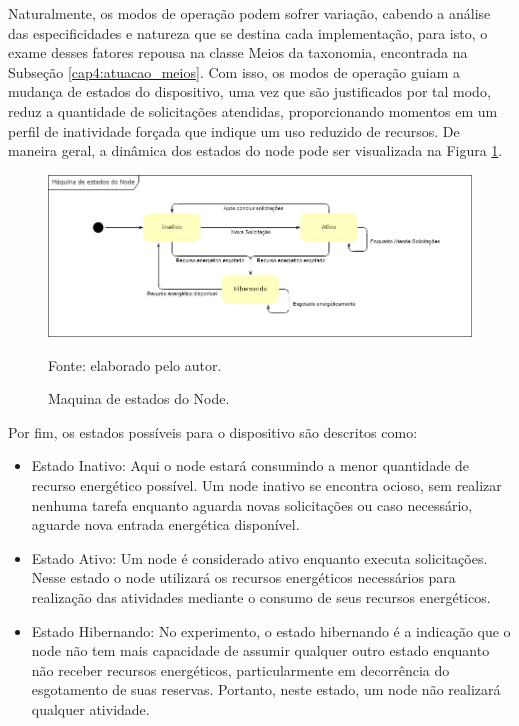 Naturalmente, os modos de operação podem sofrer variação, cabendo a análise das especificidades e natureza que se destina cada implementação, para isto, o exame desses fatores repousa na classe Meios da taxonomia, encontrada na Subseção \ref{cap4:atuacao_meios}. Com isso, os modos de operação guiam a mudança de estados do dispositivo, uma vez que são justificados por tal modo, reduz a quantidade de solicitações atendidas, proporcionando momentos em um perfil de inatividade forçada que indique um uso reduzido de recursos. De maneira geral, a dinâmica dos estados do node pode ser visualizada na Figura \ref{fig:cap6maquinaestados}. 

\begin{figure}[H]
	\centering
	
	\caption{Maquina de estados do Node.}
	\label{fig:cap6maquinaestados}
	\noindent\includegraphics[width=0.75\linewidth]{Imagens/cap6/cap6maquinaestados.jpg} 
	
	Fonte: elaborado pelo autor.
\end{figure}

Por fim, os estados possíveis para o dispositivo são descritos como:
\begin{itemize}
	\item Estado Inativo: Aqui o node estará consumindo a menor quantidade de recurso energético possível. Um node inativo se encontra ocioso, sem realizar nenhuma tarefa enquanto aguarda novas solicitações ou caso necessário, aguarde nova entrada energética disponível.
	\item Estado Ativo: Um node é considerado ativo enquanto executa solicitações. Nesse estado o node utilizará os recursos energéticos necessários para realização das atividades mediante o consumo de seus recursos energéticos. 
	\item Estado Hibernando: No experimento, o estado hibernando é a indicação que o node não tem mais capacidade de assumir qualquer outro estado enquanto não receber recursos energéticos, particularmente em decorrência do esgotamento de suas reservas. Portanto, neste estado, um node não realizará qualquer atividade.	
	
\end{itemize}

